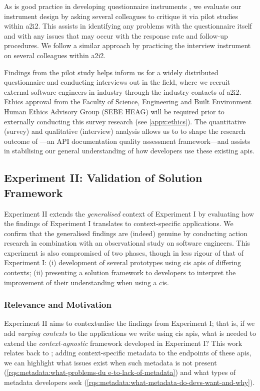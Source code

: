 As is good practice in developing questionnaire instruments , we evaluate our instrument design by asking several colleagues to critique it via pilot studies within \gls{a2i2}. This assists in identifying any problems with the questionnaire itself and with any issues that may occur with the response rate and follow-up procedures. We follow a similar approach by practicing the interview instrument on several colleagues within \gls{a2i2}.

Findings from the pilot study helps inform us for a widely distributed questionnaire and conducting interviews out in the field, where we recruit external software engineers in industry through the industry contacts of \gls{a2i2}. Ethics approval from the Faculty of Science, Engineering and Built Environment Human Ethics Advisory Group (SEBE HEAG) will be required prior to externally conducting this survey research (see \cref{appx:ethics}). The quantitative (survey) and qualitative (interview) analysis allows us to to shape the research outcome of ---an API documentation quality assessment framework---and assists in stabilising our general understanding of how developers use these existing \glspl{api}.

\subsection{Experiment II: Validation of Solution Framework}

Experiment II extends the \textit{generalised} context of Experiment I by evaluating how the findings of Experiment I translates to context-specific applications. We confirm that the generalised findings are (indeed) genuine by conducting action research in combination with an observational study on software engineers. This experiment is also compromised of two phases, though in less rigour of that of Experiment I: (i) development of several prototypes using \gls{cis} \glspl{api} of differing contexts; (ii) presenting a solution framework to developers to interpret the improvement of their understanding when using a \gls{cis}.

\subsubsection{Relevance and Motivation}

Experiment II aims to contextualise the findings from Experiment I; that is, if we add \textit{varying contexts} to the applications we write using \gls{cis} \glspl{api}, what is needed to extend the \textit{context-agnostic} framework developed in Experiment I? This work relates back to ; adding context-specific metadata to the endpoints of these \glspl{api}, we can highlight what issues exist when such metadata is not present (\ref{rqs:metadata:what-problems-du                                                                e-to-lack-of-metadata}) and what types of metadata developers seek (\ref{rqs:metadata:what-metadata-do-devs-want-and-why}).

